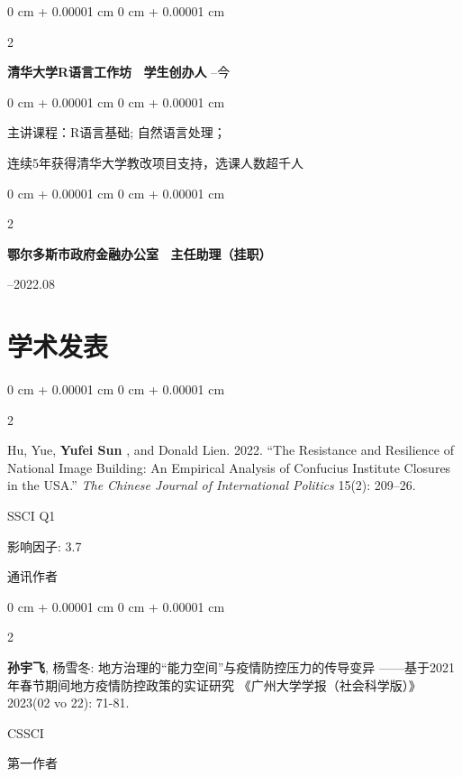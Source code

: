 \documentclass[10pt, letterpaper]{article}
\newenvironment{onecolentry}{
    \begin{adjustwidth}{
        0 cm + 0.00001 cm
    }{
        0 cm + 0.00001 cm
    }
}{
    \end{adjustwidth}
} %
\newenvironment{twocolentry}[2][]{
    \onecolentry
    \def\secondColumn{#2}
    \setcolumnwidth{\fill, 2.5 cm}
    \begin{paracol}{2}
}{
    \switchcolumn \raggedleft \secondColumn
    \end{paracol}
    \endonecolentry
} %
\begin{document}
        \begin{twocolentry}{
            2020.09–今
        }
        \textbf{清华大学R语言工作坊 \ 学生创办人}\end{twocolentry}

        \vspace{0.01 cm}  %
        \begin{onecolentry}
            \begin{itemize}[
                topsep=0.005cm,   %
                parsep=0.005cm,   %
                partopsep=0pt,    %
                itemsep=0pt,      %
                leftmargin=0cm + 10pt
            ]

                主讲课程：R语言基础; 自然语言处理；
                
                连续5年获得清华大学教改项目支持，选课人数超千人
            \end{itemize}
        \end{onecolentry}

        \begin{twocolentry}{
            2022.07–2022.08
        }
        \textbf{鄂尔多斯市政府金融办公室 \ 主任助理（挂职）}
    
        \end{twocolentry}
    
    \section{学术发表}

        \begin{twocolentry}{
            SSCI Q1

            影响因子: 3.7
            
            通讯作者
        }
        Hu, Yue, \textbf{Yufei Sun} , and Donald Lien. 2022. “The Resistance and Resilience of National Image Building: An Empirical Analysis of Confucius Institute Closures in the USA.” \textit{The Chinese Journal of International Politics} 15(2): 209–26.
        \end{twocolentry}

        \begin{twocolentry}{
            CSSCI
            
            第一作者
        }
        \textbf{孙宇飞}, 杨雪冬: 地方治理的“能力空间”与疫情防控压力的传导变异 ——基于2021年春节期间地方疫情防控政策的实证研究 《广州大学学报（社会科学版）》2023(02 vo 22): 71-81.
    \end{twocolentry}
\end{document}
